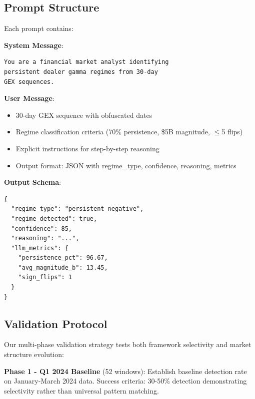 \subsection{Prompt Structure}

Each prompt contains:

\vspace{0.2cm}

\noindent\textbf{System Message}:
\begin{verbatim}
You are a financial market analyst identifying
persistent dealer gamma regimes from 30-day
GEX sequences.
\end{verbatim}

\vspace{0.2cm}

\noindent\textbf{User Message}:
\begin{itemize}
\item 30-day GEX sequence with obfuscated dates
\item Regime classification criteria (70\% persistence, \$5B magnitude, $\leq$5 flips)
\item Explicit instructions for step-by-step reasoning
\item Output format: JSON with regime\_type, confidence, reasoning, metrics
\end{itemize}

\vspace{0.2cm}

\noindent\textbf{Output Schema}:
\begin{verbatim}
{
  "regime_type": "persistent_negative",
  "regime_detected": true,
  "confidence": 85,
  "reasoning": "...",
  "llm_metrics": {
    "persistence_pct": 96.67,
    "avg_magnitude_b": 13.45,
    "sign_flips": 1
  }
}
\end{verbatim}

\subsection{Validation Protocol}

Our multi-phase validation strategy tests both framework selectivity and market structure evolution:

\vspace{0.2cm}

\noindent\textbf{Phase 1 - Q1 2024 Baseline} (52 windows): Establish baseline detection rate on January-March 2024 data. Success criteria: 30-50\% detection demonstrating selectivity rather than universal pattern matching.

